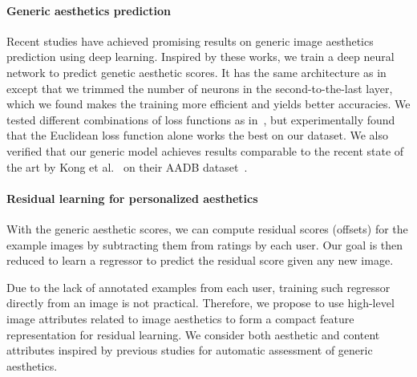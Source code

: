 \paragraph{Generic aesthetics prediction}
Recent studies\cite{kong2016photo, lu2014rapid, lu2015deep} have achieved promising results on generic image aesthetics prediction using deep learning. Inspired by these works, we train a deep neural network to predict genetic aesthetic scores. It has the same architecture as in~\cite{ioffe2015batch} except that we trimmed the number of neurons in the second-to-the-last layer, which we found makes the training more efficient and yields better accuracies. We tested different combinations of loss functions as in~\cite{kong2016photo}, but experimentally found that the Euclidean loss function alone works the best on our dataset. We also verified that our generic model achieves results comparable to the recent state of the art by Kong et al.~\cite{kong2016photo} on their AADB dataset~\cite{kong2016photo}.

\paragraph{Residual learning for personalized aesthetics}
With the generic aesthetic scores, we can compute residual scores (offsets) for the example images by subtracting them from ratings by each user. Our goal is then reduced to learn a regressor to predict the residual score given any new image.

Due to the lack of annotated examples from each user, training such regressor directly from an image is not practical. Therefore, we propose to use high-level image attributes related to image aesthetics to form a compact feature representation for residual learning.
We consider both aesthetic and content attributes inspired by previous studies\cite{kong2016photo, dhar2011high, lu2014rapid, marchesotti2015discovering, luo2011content, murray2012ava} for automatic assessment of generic aesthetics.   

